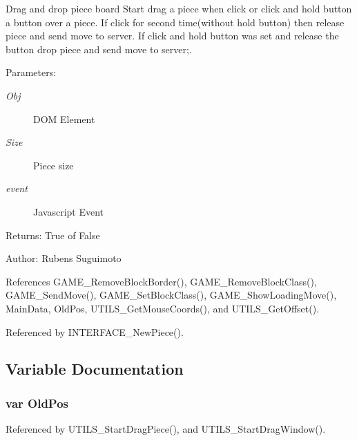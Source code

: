 Drag and drop piece board Start drag a piece when click or click and hold button a button over a piece. If click for second time(without hold button) then release piece and send move to server. If click and hold button was set and release the button drop piece and send move to server;. 

\begin{Desc}
\item[Parameters:]
\begin{description}
\item[{\em Obj}]DOM Element \item[{\em Size}]Piece size \item[{\em event}]Javascript Event \end{description}
\end{Desc}
\begin{Desc}
\item[Returns:]True of False \end{Desc}
\begin{Desc}
\item[Author:]Rubens Suguimoto \end{Desc}


References GAME\_\-RemoveBlockBorder(), GAME\_\-RemoveBlockClass(), GAME\_\-SendMove(), GAME\_\-SetBlockClass(), GAME\_\-ShowLoadingMove(), MainData, OldPos, UTILS\_\-GetMouseCoords(), and UTILS\_\-GetOffset().

Referenced by INTERFACE\_\-NewPiece().

\subsection{Variable Documentation}
\subsubsection[OldPos]{\setlength{\rightskip}{0pt plus 5cm}var {\bf OldPos}}\label{dragpiece_8js_a1074f79c7c3df2d20071d0f71647ce9}




Referenced by UTILS\_\-StartDragPiece(), and UTILS\_\-StartDragWindow().